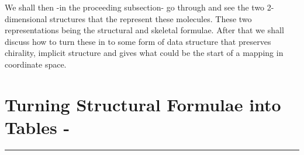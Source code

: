 \documentclass[a4paper,10pt]{article}
\begin{document}
We shall then -in the proceeding subsection- go through and see the two 2-dimensional structures that the represent these molecules. These two representations being the structural and skeletal formulae. After that we shall discuss how to turn these in to some form of data structure that preserves chirality, implicit structure and gives what could be the start of a mapping in coordinate space.

\begin{table}[h!]
\captionsetup{justification=centering}
\noindent{}
\caption{\small{The 20 Natural Amino Acids with Their 3 \& 1 Letter Codes}}
\label{tab:tnaa}
\end{table}




\section{Turning Structural Formulae into Tables -}
\rule{\textwidth}{1pt}
\end{document}
